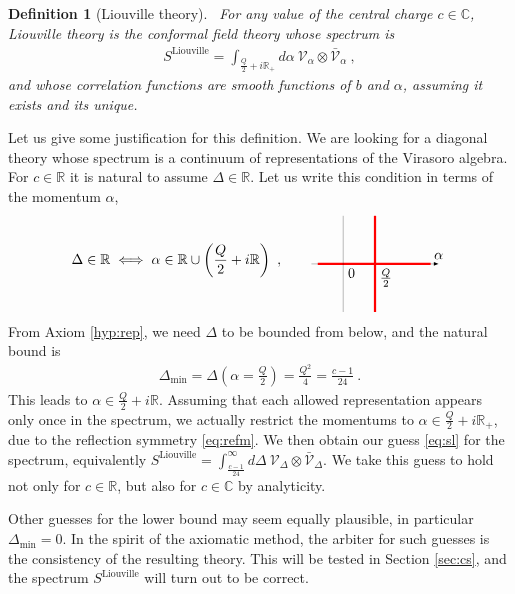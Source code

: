 \documentclass[12pt, a4paper]{article}
\theoremstyle{break}
\newtheorem{defn}[exo]{Definition}
\begin{document}
\begin{defn}[Liouville theory]
 ~\label{def:liou}
 For any value of the central charge $c\in\mathbb{C}$, Liouville theory is the conformal field theory whose spectrum is 
 \begin{align}
  S^\mathrm{Liouville} 
= \int_{\frac{Q}{2}+i\mathbb{R}_+}  d\alpha\ \mathcal V_\alpha \otimes 
   \bar{\mathcal V}_\alpha\ , 
   \label{eq:sl}
 \end{align}
and whose correlation functions are smooth functions of $b$ and $\alpha$, assuming it exists and its unique.
\end{defn}
Let us give some justification for this definition. We are looking for a diagonal theory whose spectrum is a continuum of representations of the Virasoro algebra. For $c\in \mathbb{R}$ it is natural to assume $\Delta\in \mathbb{R}$. Let us write this condition in terms of the momentum $\alpha$,
\begin{align}
 \Delta \in \mathbb{R} \iff \alpha\in \mathbb{R} \cup \left(\frac{Q}{2} + i\mathbb{R}\right)\ ,
  \qquad
   \begin{tikzpicture}[scale = .4, baseline=(current  bounding  box.center)]
  \draw[-latex, very thin] (-2, 0) -- (0, 0) node[below right] {$0$} -- (2, 0) node[below right] {$\frac{Q}{2}$} -- (4, 0)  -- (6, 0) node[above] {$\alpha$};
  \draw[red, ultra thick] (-1.6, 0) -- (5.5, 0);
  \draw[red, ultra thick] (2, -3) -- (2, 3);
  \draw[very thin] (0, -3) -- (0, 3);
 \end{tikzpicture}
\end{align}
From Axiom \ref{hyp:rep}, 
we need $\Delta$ to be bounded from below, and the natural bound is 
\begin{align}
 \Delta_\text{min}=\Delta\left(\alpha=\frac{Q}{2}\right) = \frac{Q^2}{4}=\frac{c-1}{24}\ .
\end{align}
This leads to $\alpha \in \frac{Q}{2}+i\mathbb{R}$. Assuming that each allowed representation appears only once in the spectrum, we actually restrict the momentums to $\alpha \in \frac{Q}{2}+i\mathbb{R}_+$, due to the reflection symmetry \eqref{eq:refm}.
We then obtain our guess \eqref{eq:sl} for the spectrum, equivalently $S^\mathrm{Liouville} 
= \int_{\frac{c-1}{24}}^\infty d\Delta\ \mathcal V_{\Delta}\otimes \bar{\mathcal{V}}_\Delta $.
We take this guess to hold not only for $c\in\mathbb{R}$, but also for $c\in\mathbb{C}$ by analyticity.

Other guesses for the lower bound may seem equally plausible, in particular $\Delta_\text{min}=0$. In the spirit of the axiomatic method, the arbiter for such guesses is the consistency of the resulting theory. 
This will be tested in Section \ref{sec:cs}, and the spectrum $S^\mathrm{Liouville}$ will turn out to be correct.
\end{document}
